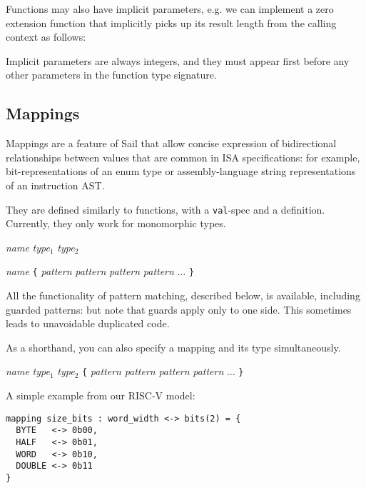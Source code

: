 Functions may also have implicit parameters, e.g. we can implement a
zero extension function that implicitly picks up its result length
from the calling context as follows:

Implicit parameters are always integers, and they must appear first
before any other parameters in the function type signature.

\subsection{Mappings}
\label{sec:mappings}

Mappings are a feature of Sail that allow concise expression of
bidirectional relationships between values that are common in ISA
specifications: for example, bit-representations of an enum type or
assembly-language string representations of an instruction AST.

They are defined similarly to functions, with a \verb|val|-spec and a
definition. Currently, they only work for monomorphic types.

\begin{center}
   \textit{name} \ll{:}  \textit{type$_1$} \ll{<->} \textit{type$_2$}
\end{center}

\begin{center}
   \textit{name} \ll{=} \verb|{|
     \textit{pattern} \ll{<->} \textit{pattern} \ll{,}
     \textit{pattern} \ll{<->} \textit{pattern} \ll{,}
     $\ldots$
  \verb|}|
\end{center}

All the functionality of pattern matching, described below, is
available, including guarded patterns: but note that guards apply only
to one side. This sometimes leads to unavoidable duplicated code.

As a shorthand, you can also specify a mapping and its type
simultaneously.

\begin{center}
    \textit{name} \ll{:} \textit{type$_1$} \ll{<->} \textit{type$_2$} \ll{=} \verb|{|
     \textit{pattern} \ll{<->} \textit{pattern} \ll{,}
     \textit{pattern} \ll{<->} \textit{pattern} \ll{,}
     $\ldots$
  \verb|}|
\end{center}

A simple example from our RISC-V model:

\begin{lstlisting}
mapping size_bits : word_width <-> bits(2) = {
  BYTE   <-> 0b00,
  HALF   <-> 0b01,
  WORD   <-> 0b10,
  DOUBLE <-> 0b11
}
\end{lstlisting}

